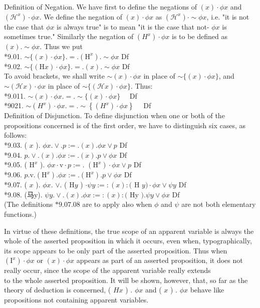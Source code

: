 \documentclass[10pt]{article}
\begin{document}
Definition of Negation. We have first to define the negations of $(x) \cdot \phi x$ and $\left(\mathcal{H}^{x}\right) \cdot \phi x$. We define the negation of $(x) \cdot \phi x$ as $\left(\mathcal{H}^{x}\right) \cdot \sim \phi x$, i.e. "it is not the case that $\phi x$ is always true" is to mean "it is the case that not- $\phi x$ is sometimes true." Similarly the negation of $\left(H^{x}\right) \cdot \phi x$ is to be defined as $(x) . \sim \phi x$. Thus we put\\
*9.01. $\sim\{(x) \cdot \phi x\} .=.\left(\mathrm{H}^{x}\right) . \sim \phi x$ Df\\
*9.02. $\sim\{(\mathrm{H} x) \cdot \phi x\} .=.(x) . \sim \phi x$ Df\\
To avoid brackets, we shall write $\sim(x) \cdot \phi x$ in place of $\sim\{(x) \cdot \phi x\}$, and $\sim(\mathcal{H} x) \cdot \phi x$ in place of $\sim\{(\mathcal{H} x) \cdot \phi x\}$. Thus:\\
*9.011. $\sim(x) \cdot \phi x .=. \sim\{(x) \cdot \phi x\} \quad$ Df\\
*9021. $\sim\left(H^{x}\right) \cdot \phi x .=. \sim\left\{\left(H^{x}\right) \cdot \phi x\right\} \quad$ Df\\
Definition of Disjunction. To define disjunction when one or both of the propositions concerned is of the first order, we have to distinguish six cases, as follows:\\
*9.03. ( $x$ ). $\phi x . \vee . p:=.(x) . \phi x \vee p$ Df\\
*9.04. $p . \vee .(x) . \phi x:=.(x) . p \vee \phi x$ Df\\
*9.05. ( $\mathrm{H}^{x}$ ). $\phi x \cdot \mathrm{v} \cdot p:=$. $\left(\mathrm{H}^{x}\right) \cdot \phi x \vee p$ Df\\
*9.06. $p . \mathrm{v} .\left(\mathrm{H}^{x}\right) . \phi x:=.\left(\mathrm{H}^{x}\right) . p \vee \phi x$ Df\\
*9.07. ( $x$ ). $\phi x$. $\vee$. ( $\mathrm{H} y$ ) $\cdot \psi y:=:(x):($ H $y) \cdot \phi x \vee \psi y$ Df\\
*9.08. (马y). $\psi y . \vee .(x) . \phi x:=:(x):($ Hy $) . \psi y \vee \phi x$ Df\\
(The definitions $* 9.07 .08$ are to apply also when $\phi$ and $\psi$ are not both elementary functions.)

In virtue of these definitions, the true scope of an apparent variable is always the whole of the asserted proposition in which it occurs, even when, typographically, its scope appears to be only part of the asserted proposition. Thus when $\left(\mathrm{I}^{x}\right) \cdot \phi x$ or $(x) \cdot \phi x$ appears as part of an asserted proposition, it does not really occur, since the scope of the apparent variable really extends\\
to the whole asserted proposition. It will be shown, however, that, so far as the theory of deduction is concerned, ( $H x$ ) . $\phi x$ and ( $x$ ) . $\phi x$ behave like propositions not containing apparent variables.
\end{document}
